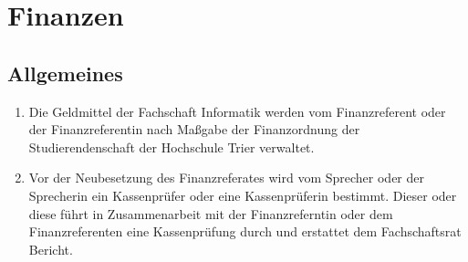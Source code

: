 \section{Finanzen}
\subsection{Allgemeines}
\begin{enumerate}
\item Die Geldmittel der Fachschaft Informatik werden vom Finanzreferent oder der Finanzreferentin nach Maßgabe der Finanzordnung der Studierendenschaft der Hochschule Trier verwaltet.
\item Vor der Neubesetzung des Finanzreferates wird vom Sprecher oder der Sprecherin ein Kassenprüfer oder eine Kassenprüferin bestimmt. Dieser oder diese führt in Zusammenarbeit mit der Finanzreferntin oder dem Finanzreferenten eine Kassenprüfung durch und erstattet dem Fachschaftsrat Bericht.
\end{enumerate}
